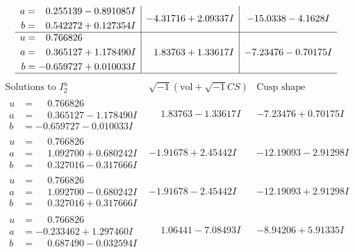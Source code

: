 \documentclass[1p]{elsarticle_modified}
\theoremstyle{definition}
\newcommand{\I}{\sqrt{-1}}
\begin{document}
$$\begin{array}{c|c|c}
\begin{aligned}
a &= \phantom{-}0.255139 - 0.891085 I \\
b &= \phantom{-}0.542272 + 0.127354 I\end{aligned}
 & -4.31716 + 2.09337 I & -15.0338 - 4.1628 I \\ \hline\begin{aligned}
u &= \phantom{-}0.766826\phantom{ +0.000000I} \\
a &= \phantom{-}0.365127 + 1.178490 I \\
b &= -0.659727 + 0.010033 I\end{aligned}
 & \phantom{-}1.83763 + 1.33617 I & -7.23476 - 0.70175 I\\
 \hline 
 \end{array}$$\newpage$$\begin{array}{c|c|c}  
\text{Solutions to }I^u_{2}& \I (\text{vol} + \sqrt{-1}CS) & \text{Cusp shape}\\
 \hline 
\begin{aligned}
u &= \phantom{-}0.766826\phantom{ +0.000000I} \\
a &= \phantom{-}0.365127 - 1.178490 I \\
b &= -0.659727 - 0.010033 I\end{aligned}
 & \phantom{-}1.83763 - 1.33617 I & -7.23476 + 0.70175 I \\ \hline\begin{aligned}
u &= \phantom{-}0.766826\phantom{ +0.000000I} \\
a &= \phantom{-}1.092700 + 0.680242 I \\
b &= \phantom{-}0.327016 - 0.317666 I\end{aligned}
 & -1.91678 + 2.45442 I & -12.19093 - 2.91298 I \\ \hline\begin{aligned}
u &= \phantom{-}0.766826\phantom{ +0.000000I} \\
a &= \phantom{-}1.092700 - 0.680242 I \\
b &= \phantom{-}0.327016 + 0.317666 I\end{aligned}
 & -1.91678 - 2.45442 I & -12.19093 + 2.91298 I \\ \hline\begin{aligned}
u &= \phantom{-}0.766826\phantom{ +0.000000I} \\
a &= -0.233462 + 1.297460 I \\
b &= \phantom{-}0.687490 - 0.032594 I\end{aligned}
 & \phantom{-}1.06441 - 7.08493 I & -8.94206 + 5.91335 I \\ \hline\begin{aligned}

\end{aligned}
\end{array}$$
\end{document}
